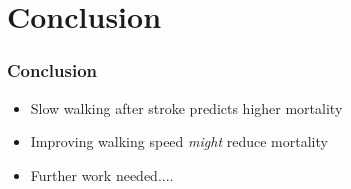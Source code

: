 \documentclass{beamer}
\begin{document}
\section{Conclusion}
\begin{frame}\frametitle{Conclusion}
\begin{itemize}
  \item Slow walking after stroke predicts higher mortality
  \item Improving walking speed \emph{might} reduce mortality
  \item Further work needed....
\end{itemize}
\end{frame}
\end{document}
